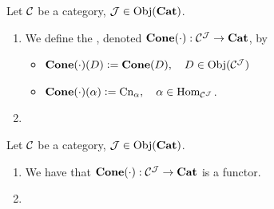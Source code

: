 \documentclass{book}
\begin{document}
	\begin{defn}
		Let $\MC$ be a category, $\MJ \in \Obj(\bCat)$. 
		\begin{enumerate}
			\item We define the , denoted $\bCone(\cdot):\MC^{\MJ} \rightarrow \bCat$, by
			\begin{itemize}
				\item $\bCone(\cdot)(D) \defeq \bCone(D), \quad D \in \Obj(\MC^{\MJ})$ 
				\item $\bCone(\cdot)(\al) \defeq \Cn_{\al}, \quad \al \in \Hom_{\MC^{\MJ}}$.
			\end{itemize}
			\item {}
		\end{enumerate}
	\end{defn}
	
	\begin{ex}
		Let $\MC$ be a category, $\MJ \in \Obj(\bCat)$. 
		\begin{enumerate}
			\item We have that $\bCone(\cdot):\MC^{\MJ} \rightarrow \bCat$ is a functor.
			\item {}
		\end{enumerate}
	\end{ex}
	
\end{document}
